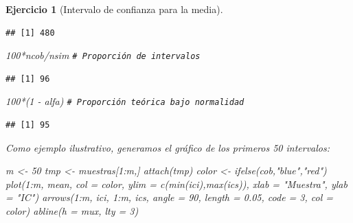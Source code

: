 \documentclass[
]{book}
\newenvironment{Shaded}{\begin{snugshade}}{\end{snugshade}}
\newcommand{\AttributeTok}[1]{\textcolor[rgb]{0.77,0.63,0.00}{#1}}
\newcommand{\CommentTok}[1]{\textcolor[rgb]{0.56,0.35,0.01}{\textit{#1}}}
\newcommand{\DecValTok}[1]{\textcolor[rgb]{0.00,0.00,0.81}{#1}}
\newcommand{\FloatTok}[1]{\textcolor[rgb]{0.00,0.00,0.81}{#1}}
\newcommand{\FunctionTok}[1]{\textcolor[rgb]{0.00,0.00,0.00}{#1}}
\newcommand{\NormalTok}[1]{#1}
\newcommand{\OtherTok}[1]{\textcolor[rgb]{0.56,0.35,0.01}{#1}}
\newcommand{\SpecialCharTok}[1]{\textcolor[rgb]{0.00,0.00,0.00}{#1}}
\newcommand{\StringTok}[1]{\textcolor[rgb]{0.31,0.60,0.02}{#1}}
\theoremstyle{break}
\newtheorem{exercise}{Ejercicio}[chapter]
\theoremstyle{nonumberplain}
\renewcommand{\CommentTok}[1]{\textcolor[rgb]{0.41,0.41,0.41}{\texttt{#1}}}
\begin{document}
\begin{exercise}[Intervalo de confianza para la media]
\begin{enumerate}
\begin{verbatim}
## [1] 480
\end{verbatim}

\begin{Shaded}
\begin{Highlighting}[]
\DecValTok{100}\SpecialCharTok{*}\NormalTok{ncob}\SpecialCharTok{/}\NormalTok{nsim     }\CommentTok{\# Proporción de intervalos}
\end{Highlighting}
\end{Shaded}

\begin{verbatim}
## [1] 96
\end{verbatim}

\begin{Shaded}
\begin{Highlighting}[]
\DecValTok{100}\SpecialCharTok{*}\NormalTok{(}\DecValTok{1} \SpecialCharTok{{-}}\NormalTok{ alfa)    }\CommentTok{\# Proporción teórica bajo normalidad}
\end{Highlighting}
\end{Shaded}

\begin{verbatim}
## [1] 95
\end{verbatim}

  Como ejemplo ilustrativo, generamos el gráfico de los primeros 50 intervalos:

\begin{Shaded}
\begin{Highlighting}[]
\NormalTok{m }\OtherTok{\textless{}{-}} \DecValTok{50}
\NormalTok{tmp }\OtherTok{\textless{}{-}}\NormalTok{ muestras[}\DecValTok{1}\SpecialCharTok{:}\NormalTok{m,]}
\FunctionTok{attach}\NormalTok{(tmp)}
\NormalTok{color }\OtherTok{\textless{}{-}} \FunctionTok{ifelse}\NormalTok{(cob,}\StringTok{"blue"}\NormalTok{,}\StringTok{"red"}\NormalTok{)}
\FunctionTok{plot}\NormalTok{(}\DecValTok{1}\SpecialCharTok{:}\NormalTok{m, mean, }\AttributeTok{col =}\NormalTok{ color, }\AttributeTok{ylim =} \FunctionTok{c}\NormalTok{(}\FunctionTok{min}\NormalTok{(ici),}\FunctionTok{max}\NormalTok{(ics)), }
     \AttributeTok{xlab =} \StringTok{"Muestra"}\NormalTok{, }\AttributeTok{ylab =} \StringTok{"IC"}\NormalTok{)}
\FunctionTok{arrows}\NormalTok{(}\DecValTok{1}\SpecialCharTok{:}\NormalTok{m, ici, }\DecValTok{1}\SpecialCharTok{:}\NormalTok{m, ics, }\AttributeTok{angle =} \DecValTok{90}\NormalTok{, }\AttributeTok{length =} \FloatTok{0.05}\NormalTok{, }\AttributeTok{code =} \DecValTok{3}\NormalTok{, }\AttributeTok{col =}\NormalTok{ color)}
\FunctionTok{abline}\NormalTok{(}\AttributeTok{h =}\NormalTok{ mux, }\AttributeTok{lty =} \DecValTok{3}\NormalTok{)}
\end{Highlighting}
\end{Shaded}


\end{enumerate}
\end{exercise}
\end{document}
